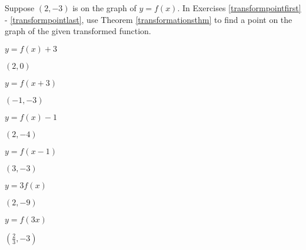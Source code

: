 \documentclass{ximera}
\begin{document}
	\author{Stitz-Zeager}



\label{ExercisesforTransformations}

Suppose $(2,-3)$ is on the graph of $y = f(x)$.  In Exercises \ref{transformpointfirst} - \ref{transformpointlast}, use Theorem \ref{transformationsthm} to find a point on the graph of the given transformed function.  




\begin{question}
$y = f(x)+3$
\begin{solution}
$(2,0)$
\end{solution}

\end{question}

\begin{question}
$y = f(x+3)$
\begin{solution}
$(-1,-3)$
\end{solution}

\end{question}

\begin{question}
$y = f(x)-1$

\begin{solution}
$(2,-4)$

\end{solution}

\end{question}

\begin{question}
$y = f(x-1)$
\begin{solution}
$(3,-3)$
\end{solution}

\end{question}

\begin{question}
$y = 3f(x)$
\begin{solution}
$(2,-9)$
\end{solution}

\end{question}

\begin{question}
$y = f(3x)$

\begin{solution}
$\left(\frac{2}{3}, -3\right)$

\end{solution}

\end{question}
\end{document}
